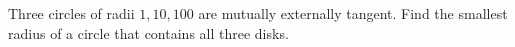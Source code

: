 Three circles of radii $1,10,100$ are mutually externally tangent. Find the smallest radius of a circle that contains all three disks.
